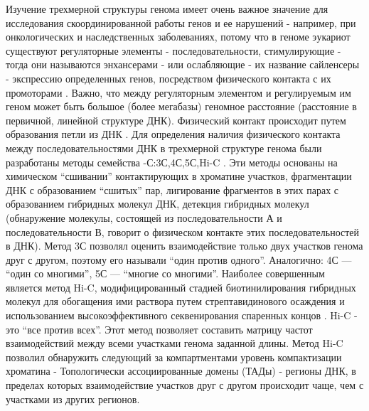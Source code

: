    Изучение трехмерной структуры генома имеет очень важное значение для исследования скоординированной работы генов и ее нарушений - например, при онкологических и наследственных заболеваниях, потому что в геноме эукариот существуют регуляторные элементы - последовательности, стимулирующие  - тогда они называются энхансерами - или ослабляющие - их название сайленсеры - экспрессию определенных генов, посредством физического контакта с их промоторами \cite{cavalli_functional_2013,nizovtseva_towards_2017}. Важно, что между регуляторным элементом и регулируемым им геном может быть большое (более мегабазы) геномное расстояние (расстояние в первичной, линейной структуре ДНК). Физический контакт происходит путем образования петли из ДНК \cite{rao_3d_2014}. Для определения наличия физического контакта между последовательностями ДНК в трехмерной структуре генома были разработаны методы семейства -С:3С,4С,5С,Hi-C \cite{fraser_overview_2015}. Эти методы основаны на химическом ``сшивании'' контактирующих в хроматине участков, фрагментации ДНК с образованием ``сшитых'' пар, лигирование фрагментов в этих парах с образованием гибридных молекул ДНК, детекция гибридных молекул (обнаружение молекулы, состоящей из последовательности А и последовательности В, говорит о физическом контакте этих последовательностей в ДНК). Метод 3С позволял оценить взаимодействие только двух участков генома друг с другом, поэтому его называли ``один против одного''. Аналогично: 4С — ``один со многими'', 5С — ``многие со многими''. Наиболее совершенным является метод Hi-C, модифицированный стадией биотинилирования гибридных молекул для обогащения ими раствора путем стрептавидинового осаждения и использованием высокоэффективного секвенирования спаренных концов \cite{lieberman-aiden_comprehensive_2009}. Hi-C - это ``все против всех''. Этот метод позволяет составить матрицу частот взаимодействий между всеми участками генома заданной длины. Метод Hi-C позволил обнаружить следующий за компартментами уровень компактизации хроматина - Топологически ассоциированные домены (ТАДы) - регионы ДНК, в пределах которых взаимодействие участков друг с другом происходит чаще, чем с участками из других регионов\cite{dixon_topological_2012}.
    
